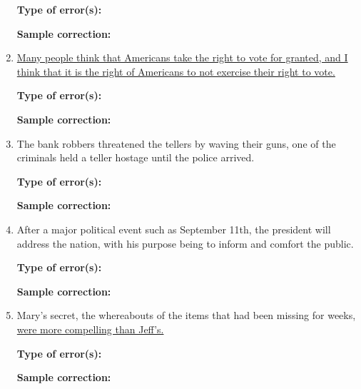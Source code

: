 \begin{spacing}{1.5}
\begin{enumerate}
\bigskip
\textbf{Type of error(s):} \hrulefill

\textbf{Sample correction:} \hrulefill

\item \ul{Many people think that Americans take the right to vote for granted, and I think that it is the right of Americans to not exercise their right to vote.}

\bigskip
\textbf{Type of error(s):} \hrulefill

\textbf{Sample correction:} \hrulefill

\item The bank robbers threatened the tellers by waving their guns, one of the criminals held a teller hostage until the police arrived. 

\bigskip
\textbf{Type of error(s):} \hrulefill

\textbf{Sample correction:} \hrulefill

\item After a major political event such as September 11th, the president will address the nation, with his purpose being to inform and comfort the public.

\bigskip
\textbf{Type of error(s):} \hrulefill

\textbf{Sample correction:} \hrulefill

\item Mary's secret, the whereabouts of the items that had been missing for weeks, \ul{were more compelling than Jeff's.}

\bigskip
\textbf{Type of error(s):} \hrulefill

\textbf{Sample correction:} \hrulefill
\end{enumerate}
\end{spacing}